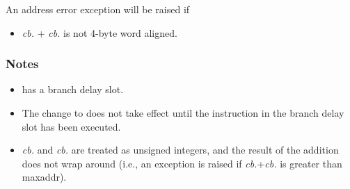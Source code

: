 An address error exception will be raised if

\begin{itemize}
\item
\textit{cb.\cbase{}} + \textit{cb.\coffset{}} is not 4-byte word aligned.
\end{itemize}

\subsubsection*{Notes}

\begin{itemize}
\item
{} has a branch delay slot.
\item
The change to \PCC{} does not take effect until the instruction in the branch
delay slot has been executed.
\item
{}
\textit{cb.\cbase{}} and \textit{cb.\clength{}} are treated as unsigned integers,
and the result of the addition does not wrap around (i.e., an exception is
raised if \emph{cb.\cbase{}}+\emph{cb.\coffset{}} is greater than maxaddr).
\end{itemize}
